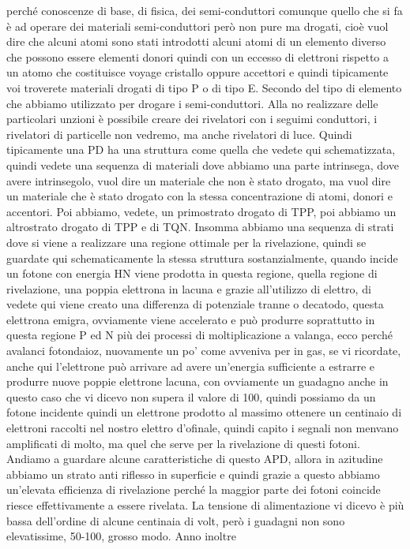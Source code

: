 perché conoscenze di base, di fisica, dei semi-conduttori comunque quello che si fa è ad operare dei materiali semi-conduttori però non pure ma drogati, cioè vuol dire che alcuni atomi sono stati introdotti alcuni atomi di un elemento diverso che possono essere elementi donori quindi con un eccesso di elettroni rispetto a un atomo che costituisce voyage cristallo oppure accettori e quindi tipicamente voi troverete materiali drogati di tipo P o di tipo E. Secondo del tipo di elemento che abbiamo utilizzato per drogare i semi-conduttori. Alla no realizzare delle particolari unzioni è possibile creare dei rivelatori con i seguimi conduttori, i rivelatori di particelle non vedremo, ma anche rivelatori di luce. Quindi tipicamente una PD ha una struttura come quella che vedete qui schematizzata, quindi vedete una sequenza di materiali dove abbiamo una parte intrinsega, dove avere intrinsegolo, vuol dire un materiale che non è stato drogato, ma vuol dire un materiale che è stato drogato con la stessa concentrazione di atomi, donori e accentori. Poi abbiamo, vedete, un primostrato drogato di TPP, poi abbiamo un altrostrato drogato di TPP e di TQN. Insomma abbiamo una sequenza di strati dove si viene a realizzare una regione ottimale per la rivelazione, quindi se guardate qui schematicamente la stessa struttura sostanzialmente, quando incide un fotone con energia HN viene prodotta in questa regione, quella regione di rivelazione, una poppia elettrona in lacuna e grazie all'utilizzo di elettro, di vedete qui viene creato una differenza di potenziale tranne o decatodo, questa elettrona emigra, ovviamente viene accelerato e può produrre soprattutto in questa regione P ed N più dei processi di moltiplicazione a valanga, ecco perché avalanci fotondaioz, nuovamente un po' come avveniva per in gas, se vi ricordate, anche qui l'elettrone può arrivare ad avere un'energia sufficiente a estrarre e produrre nuove poppie elettrone lacuna, con ovviamente un guadagno anche in questo caso che vi dicevo non supera il valore di 100, quindi possiamo da un fotone incidente quindi un elettrone prodotto al massimo ottenere un centinaio di elettroni raccolti nel nostro elettro d'ofinale, quindi capito i segnali non menvano amplificati di molto, ma quel che serve per la rivelazione di questi fotoni. Andiamo a guardare alcune caratteristiche di questo APD, allora in azitudine abbiamo un strato anti riflesso in superficie e quindi grazie a questo abbiamo un'elevata efficienza di rivelazione perché la maggior parte dei fotoni coincide riesce effettivamente a essere rivelata. La tensione di alimentazione vi dicevo è più bassa dell'ordine di alcune centinaia di volt, però i guadagni non sono elevatissime, 50-100, grosso modo. Anno inoltre 

